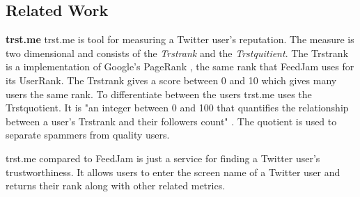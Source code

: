 \subsection{Related Work}
{\bf trst.me} \newline
trst.me \citet{Infochimps2012b} is tool for measuring a Twitter user's reputation. The measure is two dimensional and consists of the \emph{ Trstrank} and the \emph{Trstquitient}. The Trstrank is a implementation of Google's PageRank \citep{Infochimps2012a}, the same rank that FeedJam uses for its UserRank. The Trstrank gives a score between 0 and 10 which gives many users the same rank. To differentiate between the users trst.me uses the Trstquotient. It is "an integer between 0 and 100 that quantifies the relationship between a user's Trstrank and their followers count" \citep{Infochimps2012}. The quotient is used to separate spammers from quality users. 

trst.me compared to FeedJam is just a service for finding a Twitter user's trustworthiness. It allows users to enter the screen name of a Twitter user and returns their rank along with other related metrics.